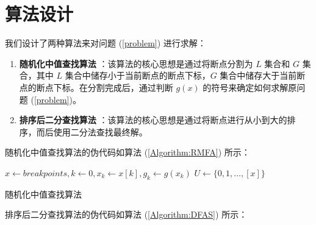 
\chapter{算法设计}

我们设计了两种算法来对问题 (\ref{problem}) 进行求解：

\begin{enumerate}
  \item \textbf{随机化中值查找算法} \cite{10.1016/j.patcog.2017.02.006}：该算法的核心思想是通过将断点分割为 $L$ 集合和 $G$ 集合，其中 $L$ 集合中储存小于当前断点的断点下标，$G$ 集合中储存大于当前断点的断点下标。在分割完成后，通过判断 $g(x)$ 的符号来确定如何求解原问题 (\ref{problem})。
  \item \textbf{排序后二分查找算法} \cite{10.5555/1577069.1755859}：该算法的核心思想是通过将断点进行从小到大的排序，而后使用二分法查找最终解。
\end{enumerate}

随机化中值查找算法的伪代码如算法 (\ref{Algorithm:RMFA}) 所示：

\medskip

\begin{algorithm}[H]
  \SetStartEndCondition{ }{}{}
  \AlgoDontDisplayBlockMarkers\SetAlgoNoEnd\SetAlgoNoLine

  $x\longleftarrow breakpoints,k\longleftarrow 0,x_k\longleftarrow x[k],g_k\longleftarrow g(x_k)$\;
  $U\longleftarrow \{0,1,\dots,[x]\}$\;
  \;
  \caption{随机化中值查找算法}\label{Algorithm:RMFA}
\end{algorithm}

排序后二分查找算法的伪代码如算法 (\ref{Algorithm:DFAS}) 所示：

\medskip

